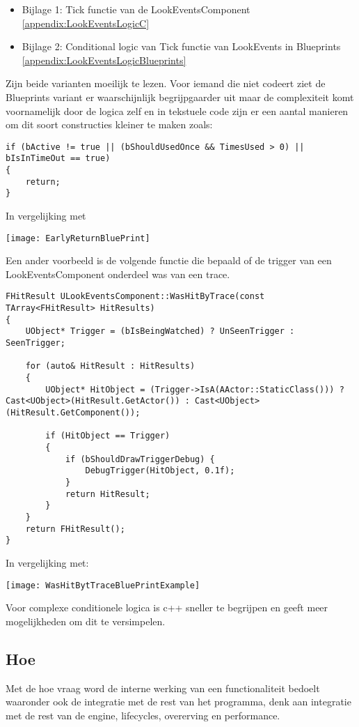 \begin{itemize}
	\item Bijlage 1: Tick functie van de LookEventsComponent \ref{appendix:LookEventsLogicC}
	\item Bijlage 2: Conditional logic van Tick functie van LookEvents in Blueprints \ref{appendix:LookEventsLogicBlueprints}
\end{itemize}

Zijn beide varianten moeilijk te lezen. Voor iemand die niet codeert ziet de Blueprints variant er waarschijnlijk begrijpgaarder uit maar de complexiteit komt voornamelijk door de logica zelf en in tekstuele code zijn er een aantal manieren om dit soort constructies kleiner te maken zoals:

\begin{lstlisting}
if (bActive != true || (bShouldUsedOnce && TimesUsed > 0) || bIsInTimeOut == true) 
{
	return;
}
\end{lstlisting}
In vergelijking met 

\texttt{[image: EarlyReturnBluePrint]}

Een ander voorbeeld is de volgende functie die bepaald of de trigger van een LookEventsComponent onderdeel was van een trace.

\begin{lstlisting}
FHitResult ULookEventsComponent::WasHitByTrace(const TArray<FHitResult> HitResults) 
{
	UObject* Trigger = (bIsBeingWatched) ? UnSeenTrigger : SeenTrigger;

	for (auto& HitResult : HitResults)
	{
		UObject* HitObject = (Trigger->IsA(AActor::StaticClass())) ? Cast<UObject>(HitResult.GetActor()) : Cast<UObject>(HitResult.GetComponent());	

		if (HitObject == Trigger)
		{
			if (bShouldDrawTriggerDebug) {
				DebugTrigger(HitObject, 0.1f);
			}
			return HitResult;
		}
	}
	return FHitResult();
}
\end{lstlisting}

In vergelijking met:

\texttt{[image: WasHitBytTraceBluePrintExample]}

Voor complexe conditionele logica is c++ sneller te begrijpen en geeft meer mogelijkheden om dit te versimpelen. 

\subsection{Hoe}
Met de hoe vraag word de interne werking van een functionaliteit bedoelt waaronder ook de integratie met de rest van het programma, denk aan integratie met de rest van de engine, lifecycles, overerving en performance.

